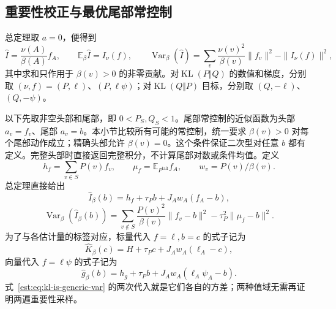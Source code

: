 \documentclass[lang=cn,scheme=chinese,openany]{../book/elegantbook}
\newcommand{\E}{\mathbb E}
\newcommand{\KL}{\operatorname{KL}}
\newcommand{\Var}{\operatorname{Var}}
\newcommand{\tail}{\mathrm{tail}}
\begin{document}
\subsection{重要性校正与最优尾部常控制}
\begin{corollary}[直接重要性采样]\label{est:thm:kl-importance}
总定理取 $a=0$，便得到
\begin{equation*}
 \widehat I=\frac{\nu(A)}{\beta(A)}f_A,\qquad
 \E_\beta\widehat I=I_\nu(f),\qquad
 \Var_\beta(\widehat I)
 =\sum_v\frac{\nu(v)^2}{\beta(v)}\|f_v\|^2-\|I_\nu(f)\|^2,
\end{equation*}
其中求和只作用于 $\beta(v)>0$ 的非零贡献。对$\KL(P\Vert Q)$ 的数值和梯度，分别取 $(\nu,f)=(P,\ell)$、$(P,\ell\psi)$；对$\KL(Q\Vert P)$ 目标，分别取 $(Q,-\ell)$、$(Q,-\psi)$。
\end{corollary}

以下先取非空头部和尾部，即 $0<P_S,Q_S<1$。尾部常控制的近似函数为头部 $a_v=f_v$、尾部 $a_v=b$。本小节比较所有可能的常控制，统一要求 $\beta(v)>0$ 对每个尾部动作成立；精确头部允许 $\beta(v)=0$。这个条件保证二次型对任意 $b$ 都有定义。完整头部时直接返回完整积分，不计算尾部对数或条件均值。定义
\begin{equation*}
 h_f=\sum_{v\in S}P(v)f_v,\qquad
 \mu_f=\E_{P^{\tail}}f_A,\qquad w_v=P(v)/\beta(v).
\end{equation*}
总定理直接给出
\begin{equation}\label{est:eq:kl-is-generic}
 \widehat I_\beta(b)=h_f+\tau_Pb+J_Aw_A(f_A-b),
\end{equation}
\begin{equation}\label{est:eq:kl-is-generic-var}
 \Var_\beta(\widehat I_\beta(b))
 =\sum_{v\notin S}\frac{P(v)^2}{\beta(v)}\|f_v-b\|^2
   -\tau_P^2\|\mu_f-b\|^2.
\end{equation}
为了与各估计量的标签对应，标量代入 $f=\ell,b=c$ 的式子记为
\begin{equation}\label{est:eq:kl-is-scalar}
 \widehat K_\beta(c)=H+\tau_Pc+J_Aw_A(\ell_A-c),
\end{equation}
向量代入 $f=\ell\psi$ 的式子记为
\begin{equation}\label{est:eq:kl-is-vector}
 \widehat g_\beta(b)=h_g+\tau_Pb+J_Aw_A(\ell_A\psi_A-b).
\end{equation}
式~\eqref{est:eq:kl-is-generic-var} 的两次代入就是它们各自的方差；两种值域无需再证明两遍重要性采样。
\end{document}
